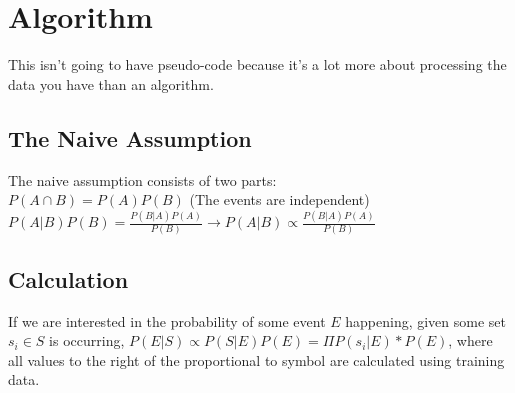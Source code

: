 \documentclass{article}
\begin{document}
\section{Algorithm}
This isn't going to have pseudo-code because it's a lot more about processing the data you have than an algorithm.
\subsection{The Naive Assumption}
The naive assumption consists of two parts:\\
$P(A\cap B) = P(A)P(B)$ (The events are independent)\\
$P(A|B)P(B) = \frac{P(B|A)P(A)}{P(B)} \rightarrow P(A|B) \propto \frac{P(B|A)P(A)}{P(B)}$\\

\subsection{Calculation}
If we are interested in the probability of some event $E$ happening, given some set $s_i\in S$ is occurring, $P(E|S) \propto P(S|E)P(E)=  \Pi{P(s_i|E)}*P(E)$, where all values to the right of the proportional to symbol are calculated using training data. 
\end{document}
